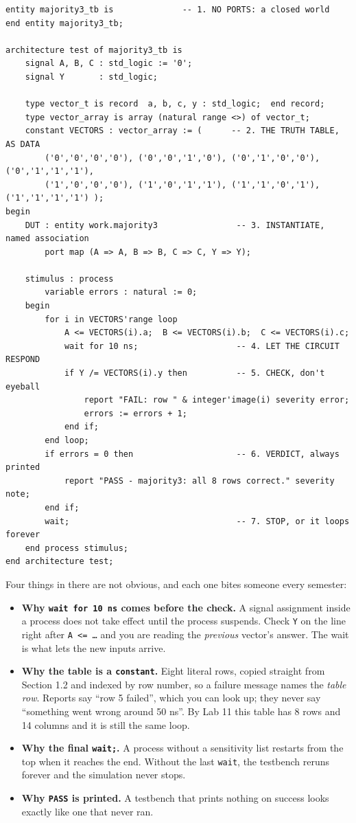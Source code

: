 \documentclass[11pt]{article}
\newcommand{\code}[1]{\texttt{#1}}
\begin{document}
\begin{lstlisting}
entity majority3_tb is              -- 1. NO PORTS: a closed world
end entity majority3_tb;

architecture test of majority3_tb is
    signal A, B, C : std_logic := '0';
    signal Y       : std_logic;

    type vector_t is record  a, b, c, y : std_logic;  end record;
    type vector_array is array (natural range <>) of vector_t;
    constant VECTORS : vector_array := (      -- 2. THE TRUTH TABLE, AS DATA
        ('0','0','0','0'), ('0','0','1','0'), ('0','1','0','0'), ('0','1','1','1'),
        ('1','0','0','0'), ('1','0','1','1'), ('1','1','0','1'), ('1','1','1','1') );
begin
    DUT : entity work.majority3                -- 3. INSTANTIATE, named association
        port map (A => A, B => B, C => C, Y => Y);

    stimulus : process
        variable errors : natural := 0;
    begin
        for i in VECTORS'range loop
            A <= VECTORS(i).a;  B <= VECTORS(i).b;  C <= VECTORS(i).c;
            wait for 10 ns;                    -- 4. LET THE CIRCUIT RESPOND
            if Y /= VECTORS(i).y then          -- 5. CHECK, don't eyeball
                report "FAIL: row " & integer'image(i) severity error;
                errors := errors + 1;
            end if;
        end loop;
        if errors = 0 then                     -- 6. VERDICT, always printed
            report "PASS - majority3: all 8 rows correct." severity note;
        end if;
        wait;                                  -- 7. STOP, or it loops forever
    end process stimulus;
end architecture test;
\end{lstlisting}

Four things in there are not obvious, and each one bites someone every semester:

\begin{itemize}[leftmargin=1.6em,itemsep=2pt]
\item \textbf{Why \code{wait for 10 ns} comes before the check.} A signal assignment
inside a process does not take effect until the process suspends. Check \code{Y} on
the line right after \code{A <= \ldots} and you are reading the \emph{previous}
vector's answer. The wait is what lets the new inputs arrive.
\item \textbf{Why the table is a \code{constant}.} Eight literal rows, copied straight
from Section 1.2 and indexed by row number, so a failure message names the
\emph{table row}. Reports say ``row 5 failed'', which you can look up; they never
say ``something went wrong around 50 ns''. By Lab 11 this table has 8 rows and 14
columns and it is still the same loop.
\item \textbf{Why the final \code{wait;}.} A process without a sensitivity list
restarts from the top when it reaches the end. Without the last \code{wait}, the
testbench reruns forever and the simulation never stops.
\item \textbf{Why \code{PASS} is printed.} A testbench that prints nothing on success
looks exactly like one that never ran.
\end{itemize}
\end{document}
